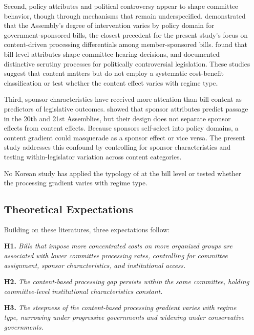 \documentclass[11pt]{article}
\begin{document}
Second, policy attributes and political controversy appear to shape committee behavior, though through mechanisms that remain underspecified. \citet{lee2021} demonstrated that the Assembly's degree of intervention varies by policy domain for government-sponsored bills, the closest precedent for the present study's focus on content-driven processing differentials among member-sponsored bills. \citet{kim2019} found that bill-level attributes shape committee hearing decisions, and \citet{seo2020} documented distinctive scrutiny processes for politically controversial legislation. These studies suggest that content matters but do not employ a systematic cost-benefit classification or test whether the content effect varies with regime type.

Third, sponsor characteristics have received more attention than bill content as predictors of legislative outcomes. \citet{an2025} showed that sponsor attributes predict passage in the 20th and 21st Assemblies, but their design does not separate sponsor effects from content effects. Because sponsors self-select into policy domains, a content gradient could masquerade as a sponsor effect or vice versa. The present study addresses this confound by controlling for sponsor characteristics and testing within-legislator variation across content categories.

No Korean study has applied the typology of \citet{wilson1980} at the bill level or tested whether the processing gradient varies with regime type.

\subsection{Theoretical Expectations}

Building on these literatures, three expectations follow:

\medskip
\noindent\textbf{H1.} \textit{Bills that impose more concentrated costs on more organized groups are associated with lower committee processing rates, controlling for committee assignment, sponsor characteristics, and institutional access.}

\medskip
\noindent\textbf{H2.} \textit{The content-based processing gap persists within the same committee, holding committee-level institutional characteristics constant.}

\medskip
\noindent\textbf{H3.} \textit{The steepness of the content-based processing gradient varies with regime type, narrowing under progressive governments and widening under conservative governments.}
\end{document}
